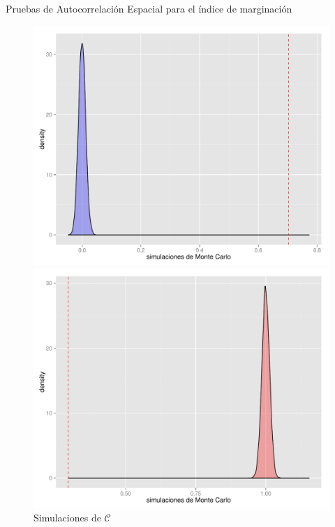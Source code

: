 \documentclass{beamer}
\begin{document}
\begin{frame}{Pruebas de Autocorrelación Espacial para el índice de marginación}
\begin{itemize}
\begin{figure}[!ht]
  \includegraphics[width=\linewidth]{./plots/moran_density.pdf}
  \caption{Simulaciones de $\mathcal{I}$}
\endminipage\hfill
{}
  \includegraphics[width=\linewidth]{./plots/geary_density.pdf}
  \caption{Simulaciones de $\mathcal{C}$}
\endminipage\hfill
\end{figure}

\end{itemize}
\end{frame}
\end{document}
